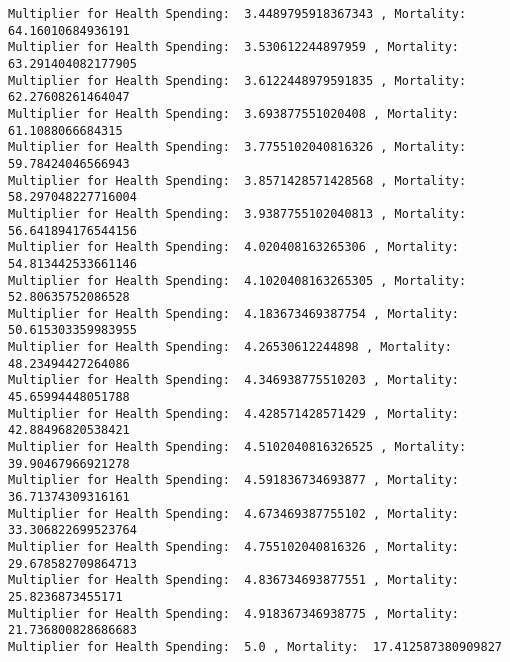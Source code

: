 \documentclass[11pt]{article}
\begin{document}
\begin{Verbatim}[commandchars=\\\{\}]
Multiplier for Health Spending:  3.4489795918367343 , Mortality:  64.16010684936191
Multiplier for Health Spending:  3.530612244897959 , Mortality:  63.291404082177905
Multiplier for Health Spending:  3.6122448979591835 , Mortality:  62.27608261464047
Multiplier for Health Spending:  3.693877551020408 , Mortality:  61.1088066684315
Multiplier for Health Spending:  3.7755102040816326 , Mortality:  59.78424046566943
Multiplier for Health Spending:  3.8571428571428568 , Mortality:  58.297048227716004
Multiplier for Health Spending:  3.9387755102040813 , Mortality:  56.641894176544156
Multiplier for Health Spending:  4.020408163265306 , Mortality:  54.813442533661146
Multiplier for Health Spending:  4.1020408163265305 , Mortality:  52.80635752086528
Multiplier for Health Spending:  4.183673469387754 , Mortality:  50.615303359983955
Multiplier for Health Spending:  4.26530612244898 , Mortality:  48.23494427264086
Multiplier for Health Spending:  4.346938775510203 , Mortality:  45.65994448051788
Multiplier for Health Spending:  4.428571428571429 , Mortality:  42.88496820538421
Multiplier for Health Spending:  4.5102040816326525 , Mortality:  39.90467966921278
Multiplier for Health Spending:  4.591836734693877 , Mortality:  36.71374309316161
Multiplier for Health Spending:  4.673469387755102 , Mortality:  33.306822699523764
Multiplier for Health Spending:  4.755102040816326 , Mortality:  29.678582709864713
Multiplier for Health Spending:  4.836734693877551 , Mortality:  25.8236873455171
Multiplier for Health Spending:  4.918367346938775 , Mortality:  21.736800828686683
Multiplier for Health Spending:  5.0 , Mortality:  17.412587380909827

    \end{Verbatim}


    
    
    
    
\end{document}
